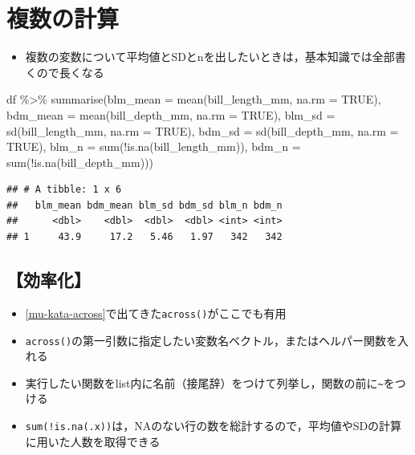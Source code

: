 \documentclass[
  xelatex,ja=standard, b5paper]{bxjsbook}
\newenvironment{Shaded}{\begin{snugshade}}{\end{snugshade}}
\newcommand{\AttributeTok}[1]{\textcolor[rgb]{0.77,0.63,0.00}{#1}}
\newcommand{\ConstantTok}[1]{\textcolor[rgb]{0.00,0.00,0.00}{#1}}
\newcommand{\FunctionTok}[1]{\textcolor[rgb]{0.00,0.00,0.00}{#1}}
\newcommand{\NormalTok}[1]{#1}
\newcommand{\SpecialCharTok}[1]{\textcolor[rgb]{0.00,0.00,0.00}{#1}}
\providecommand{\tightlist}{%
  \setlength{\itemsep}{0pt}\setlength{\parskip}{0pt}}
\begin{document}
\hypertarget{su-st-multiple}{%
\section{複数の計算}\label{su-st-multiple}}

\begin{itemize}
\tightlist
\item
  複数の変数について平均値とSDとnを出したいときは，基本知識では全部書くので長くなる
\end{itemize}

\begin{Shaded}
\begin{Highlighting}[]
\NormalTok{df }\SpecialCharTok{\%\textgreater{}\%} 
  \FunctionTok{summarise}\NormalTok{(}\AttributeTok{blm\_mean =} \FunctionTok{mean}\NormalTok{(bill\_length\_mm, }\AttributeTok{na.rm =} \ConstantTok{TRUE}\NormalTok{),}
            \AttributeTok{bdm\_mean =} \FunctionTok{mean}\NormalTok{(bill\_depth\_mm, }\AttributeTok{na.rm =} \ConstantTok{TRUE}\NormalTok{),}
            \AttributeTok{blm\_sd =} \FunctionTok{sd}\NormalTok{(bill\_length\_mm, }\AttributeTok{na.rm =} \ConstantTok{TRUE}\NormalTok{),}
            \AttributeTok{bdm\_sd =} \FunctionTok{sd}\NormalTok{(bill\_depth\_mm, }\AttributeTok{na.rm =} \ConstantTok{TRUE}\NormalTok{),}
            \AttributeTok{blm\_n  =} \FunctionTok{sum}\NormalTok{(}\SpecialCharTok{!}\FunctionTok{is.na}\NormalTok{(bill\_length\_mm)),}
            \AttributeTok{bdm\_n  =} \FunctionTok{sum}\NormalTok{(}\SpecialCharTok{!}\FunctionTok{is.na}\NormalTok{(bill\_depth\_mm)))}
\end{Highlighting}
\end{Shaded}

\begin{verbatim}
## # A tibble: 1 x 6
##   blm_mean bdm_mean blm_sd bdm_sd blm_n bdm_n
##      <dbl>    <dbl>  <dbl>  <dbl> <int> <int>
## 1     43.9     17.2   5.46   1.97   342   342
\end{verbatim}

\hypertarget{su-st-ef}{%
\subsection{【効率化】}\label{su-st-ef}}

\begin{itemize}
\tightlist
\item
  \ref{mu-kata-across}で出てきた\texttt{across()}がここでも有用
\item
  \texttt{across()}の第一引数に指定したい変数名ベクトル，またはヘルパー関数を入れる
\item
  実行したい関数をlist内に名前（接尾辞）をつけて列挙し，関数の前に\texttt{\textasciitilde{}}をつける
\item
  \texttt{sum(!is.na(.x))}は，NAのない行の数を総計するので，平均値やSDの計算に用いた人数を取得できる
\end{itemize}
\end{document}
